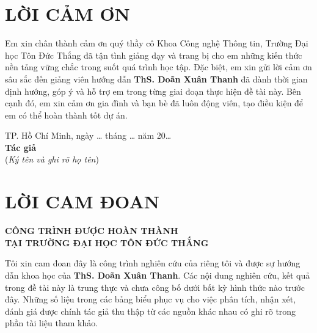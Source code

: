\documentclass[12pt, a4paper]{report}
\newcommand{\supervisor}{ThS. Doãn Xuân Thanh}
\begin{document}
\chapter*{LỜI CẢM ƠN}

Em xin chân thành cảm ơn quý thầy cô Khoa Công nghệ Thông tin, Trường Đại học Tôn Đức Thắng đã tận tình giảng dạy và trang bị cho em những kiến thức nền tảng vững chắc trong suốt quá trình học tập. Đặc biệt, em xin gửi lời cảm ơn sâu sắc đến giảng viên hướng dẫn \textbf{\supervisor} đã dành thời gian định hướng, góp ý và hỗ trợ em trong từng giai đoạn thực hiện đề tài này. Bên cạnh đó, em xin cảm ơn gia đình và bạn bè đã luôn động viên, tạo điều kiện để em có thể hoàn thành tốt dự án.

\vspace{3cm}
\begin{flushright}
  \begin{minipage}{10cm}
    \centering
    TP. Hồ Chí Minh, ngày \ldots{} tháng \ldots{} năm 20\ldots{}\\[1cm]
    \textbf{Tác giả}\\[0.3cm]
    (\textit{Ký tên và ghi rõ họ tên})
  \end{minipage}
\end{flushright}
\newpage

\chapter*{LỜI CAM ĐOAN}

\begin{center}
  \textbf{CÔNG TRÌNH ĐƯỢC HOÀN THÀNH\\
  TẠI TRƯỜNG ĐẠI HỌC TÔN ĐỨC THẮNG}
\end{center}

\noindent Tôi xin cam đoan đây là công trình nghiên cứu của riêng tôi và được sự hướng dẫn khoa học của \textbf{\supervisor}. Các nội dung nghiên cứu, kết quả trong đề tài này là trung thực và chưa công bố dưới bất kỳ hình thức nào trước đây. Những số liệu trong các bảng biểu phục vụ cho việc phân tích, nhận xét, đánh giá được chính tác giả thu thập từ các nguồn khác nhau có ghi rõ trong phần tài liệu tham khảo.
\end{document}
